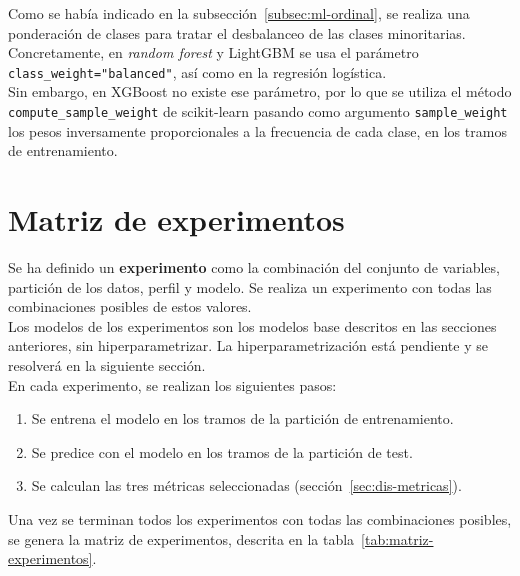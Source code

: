 Como se había indicado en la subsección~\ref{subsec:ml-ordinal}, se realiza una ponderación de clases para tratar el desbalanceo de las clases minoritarias. Concretamente, en \textit{random forest} y LightGBM se usa el parámetro \texttt{class\_\allowbreak weight=\allowbreak "balanced"}, así como en la regresión logística.
\\

Sin embargo, en XGBoost no existe ese parámetro, por lo que se utiliza el método \mbox{\texttt{compute\_sample\_weight}} de scikit-learn pasando como argumento \texttt{sample\_weight} los pesos inversamente proporcionales a la frecuencia de cada clase, en los tramos de entrenamiento.
\\

\section{Matriz de experimentos}
\label{sec:dis-matriz-experimentos}

Se ha definido un \textbf{experimento} como la combinación del conjunto de variables, partición de los datos, perfil y modelo. Se realiza un experimento con todas las combinaciones posibles de estos valores.
\\

Los modelos de los experimentos son los modelos base descritos en las secciones anteriores, sin hiperparametrizar. La hiperparametrización está pendiente y se resolverá en la siguiente sección.
\\

En cada experimento, se realizan los siguientes pasos:

\begin{enumerate}
  \item Se entrena el modelo en los tramos de la partición de entrenamiento.
  \item Se predice con el modelo en los tramos de la partición de test.
  \item Se calculan las tres métricas seleccionadas (sección~\ref{sec:dis-metricas}).
\end{enumerate}

Una vez se terminan todos los experimentos con todas las combinaciones posibles, se genera la matriz de experimentos, descrita en la tabla~\ref{tab:matriz-experimentos}.
\\

